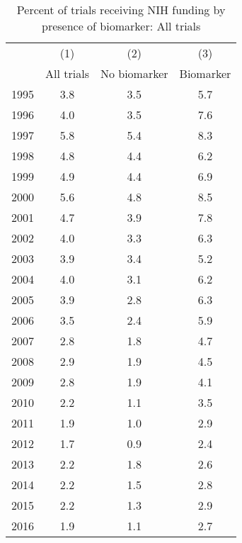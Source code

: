 \begin{table}[htbp]\centering
\caption{Percent of trials receiving NIH funding by presence of biomarker: All trials}
\begin{tabular}{l*{3}{c}}
\hline\hline
                    &\multicolumn{1}{c}{(1)}&\multicolumn{1}{c}{(2)}&\multicolumn{1}{c}{(3)}\\
                    &\multicolumn{1}{c}{All trials}&\multicolumn{1}{c}{No biomarker}&\multicolumn{1}{c}{Biomarker}\\
\hline
1995                &         3.8&         3.5&         5.7\\
1996                &         4.0&         3.5&         7.6\\
1997                &         5.8&         5.4&         8.3\\
1998                &         4.8&         4.4&         6.2\\
1999                &         4.9&         4.4&         6.9\\
2000                &         5.6&         4.8&         8.5\\
2001                &         4.7&         3.9&         7.8\\
2002                &         4.0&         3.3&         6.3\\
2003                &         3.9&         3.4&         5.2\\
2004                &         4.0&         3.1&         6.2\\
2005                &         3.9&         2.8&         6.3\\
2006                &         3.5&         2.4&         5.9\\
2007                &         2.8&         1.8&         4.7\\
2008                &         2.9&         1.9&         4.5\\
2009                &         2.8&         1.9&         4.1\\
2010                &         2.2&         1.1&         3.5\\
2011                &         1.9&         1.0&         2.9\\
2012                &         1.7&         0.9&         2.4\\
2013                &         2.2&         1.8&         2.6\\
2014                &         2.2&         1.5&         2.8\\
2015                &         2.2&         1.3&         2.9\\
2016                &         1.9&         1.1&         2.7\\
\hline\hline
\end{tabular}
\end{table}
